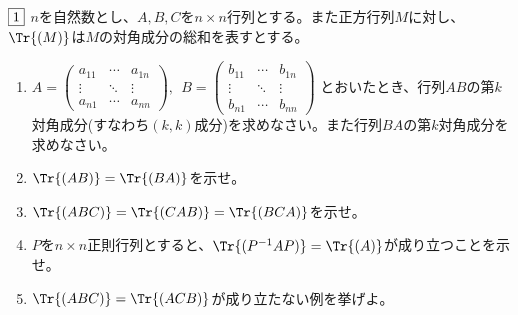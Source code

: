 \begin{tcolorbox} %
	$\fbox{1}$ $n$を自然数とし、$A, B, C$を$n\times n$行列とする。また正方行列$M$に対し、$\Tr{(M)}$は$M$の対角成分の総和を表すとする。
\begin{enumerate}
	\item $
	A= 
\begin{pmatrix}
	a_{11}& \cdots& a_{1n}\\
	\vdots& \ddots& \vdots\\
	a_{n1}& \cdots& a_{nn}
\end{pmatrix},\ \ 
	B= 
\begin{pmatrix}
	b_{11}& \cdots& b_{1n}\\
	\vdots& \ddots& \vdots\\
	b_{n1}& \cdots& b_{nn}
\end{pmatrix}$
	とおいたとき、行列$AB$の第$k$対角成分(すなわち$(k, k)$成分)を求めなさい。また行列$BA$の第$k$対角成分を求めなさい。
	\item $\Tr{(AB)}= \Tr{(BA)}$を示せ。
	\item $\Tr{(ABC)}= \Tr{(CAB)}= \Tr{(BCA)}$を示せ。
	\item $P$を$n\times n$正則行列とすると、$\Tr{(P^{-1}AP)}= \Tr{(A)}$が成り立つことを示せ。
	\item $\Tr{(ABC)}= \Tr{(ACB)}$が成り立たない例を挙げよ。
\end{enumerate}
\end{tcolorbox}

